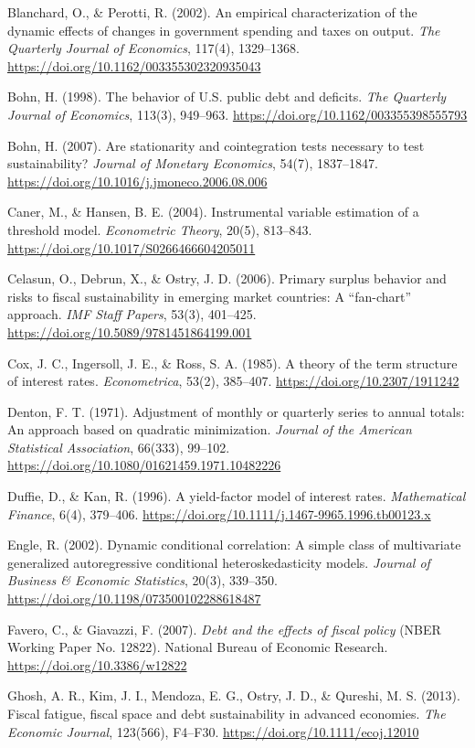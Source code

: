 \documentclass[11pt,a4paper]{article}
\begin{document}
Blanchard, O., \& Perotti, R. (2002). An empirical characterization of the dynamic effects of changes in government spending and taxes on output. \textit{The Quarterly Journal of Economics}, 117(4), 1329--1368. \url{https://doi.org/10.1162/003355302320935043}

Bohn, H. (1998). The behavior of U.S. public debt and deficits. \textit{The Quarterly Journal of Economics}, 113(3), 949--963. \url{https://doi.org/10.1162/003355398555793}

Bohn, H. (2007). Are stationarity and cointegration tests necessary to test sustainability? \textit{Journal of Monetary Economics}, 54(7), 1837--1847. \url{https://doi.org/10.1016/j.jmoneco.2006.08.006}

Caner, M., \& Hansen, B. E. (2004). Instrumental variable estimation of a threshold model. \textit{Econometric Theory}, 20(5), 813--843. \url{https://doi.org/10.1017/S0266466604205011}

Celasun, O., Debrun, X., \& Ostry, J. D. (2006). Primary surplus behavior and risks to fiscal sustainability in emerging market countries: A ``fan-chart'' approach. \textit{IMF Staff Papers}, 53(3), 401--425. \url{https://doi.org/10.5089/9781451864199.001}

Cox, J. C., Ingersoll, J. E., \& Ross, S. A. (1985). A theory of the term structure of interest rates. \textit{Econometrica}, 53(2), 385--407. \url{https://doi.org/10.2307/1911242}

Denton, F. T. (1971). Adjustment of monthly or quarterly series to annual totals: An approach based on quadratic minimization. \textit{Journal of the American Statistical Association}, 66(333), 99--102. \url{https://doi.org/10.1080/01621459.1971.10482226}

Duffie, D., \& Kan, R. (1996). A yield-factor model of interest rates. \textit{Mathematical Finance}, 6(4), 379--406. \url{https://doi.org/10.1111/j.1467-9965.1996.tb00123.x}

Engle, R. (2002). Dynamic conditional correlation: A simple class of multivariate generalized autoregressive conditional heteroskedasticity models. \textit{Journal of Business \& Economic Statistics}, 20(3), 339--350. \url{https://doi.org/10.1198/073500102288618487}

Favero, C., \& Giavazzi, F. (2007). \textit{Debt and the effects of fiscal policy} (NBER Working Paper No. 12822). National Bureau of Economic Research. \url{https://doi.org/10.3386/w12822}

Ghosh, A. R., Kim, J. I., Mendoza, E. G., Ostry, J. D., \& Qureshi, M. S. (2013). Fiscal fatigue, fiscal space and debt sustainability in advanced economies. \textit{The Economic Journal}, 123(566), F4--F30. \url{https://doi.org/10.1111/ecoj.12010}
\end{document}
